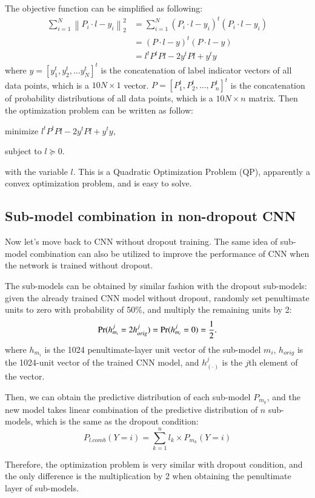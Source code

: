 \documentclass{article} %
\begin{document}
\par
The objective function can be simplified as following:
\begin{equation}
\begin{split}
\sum_{i=1}^{N}\left \| P_{i}\cdot l-y_{i} \right \|_{2}^{2} &=\sum_{i=1}^{N}(P_{i}\cdot l-y_{i})^{t}(P_{i}\cdot l-y_{i})
 \\
&=(P\cdot l-y)^{t}(P\cdot l-y)
 \\
&=l^{t}P^{t}Pl-2y^{t}Pl+y^{t}y
\end{split}
\end{equation}
where $y = \left[ y_{1}^{t}, y_{2}^{t},...y_{N}^{t}\right]^{t}$ is the concatenation of label indicator vectors of all data points, which is a $10N\times 1$ vector. $P = \left[ P_{1}^{t},P_{2}^{t},..., P_{n}^{t}\right]^{t}$ is the concatenation of probability distributions of all data points, which is a $10N \times n$  matrix. Then the optimization problem can be written as follow:
\par
\setlength{\parindent}{3em}
minimize $l^{t}P^{t}Pl-2y^{t}Pl+y^{t}y$,
\par
\setlength{\parindent}{3em}
subject to $l\succeq 0$.
\setlength{\parindent}{0pt}
\par
with the variable $l$. This is a Quadratic Optimization Problem (QP), apparently a convex optimization problem, and is easy to solve.



\subsection{Sub-model combination in non-dropout CNN}
Now let's move back to CNN without dropout training. The same idea of sub-model combination can also be utilized to improve the performance of CNN when the network is trained without dropout. 
\par
The sub-models can be obtained by similar fashion with the dropout sub-models: given the already trained CNN model without dropout, randomly set penultimate units to zero with probability of 50\%, and multiply the remaining units by 2:
\begin{equation}
\textup{Pr}(h_{m_{i}}^{j}=2h_{orig}^{j})=\textup{Pr}(h_{m_{i}}^{j}=0)=\frac{1}{2}.
\end{equation}
where  $h_{m_{i}}$ is the 1024 penultimate-layer unit vector of the sub-model $m_{i}$, $h_{orig}$ is the 1024-unit vector of the trained CNN model, and $h_{(\cdot)}^{j}$ is the $j$th element of the vector. 
\par
Then, we can obtain the predictive distribution of each sub-model $P_{m_{k}}$, and the new model takes linear combination of the predictive distribution of $n$ sub-models, which is the same as the dropout condition:
\begin{equation}
P_{l.comb}(Y=i) = \sum_{k=1}^{n}l_{k}\times P_{m_{k}}(Y=i)
\end{equation}
\par
Therefore, the optimization problem is very similar with dropout condition, and the only difference is the multiplication by 2 when obtaining the penultimate layer of sub-models.
\end{document}
